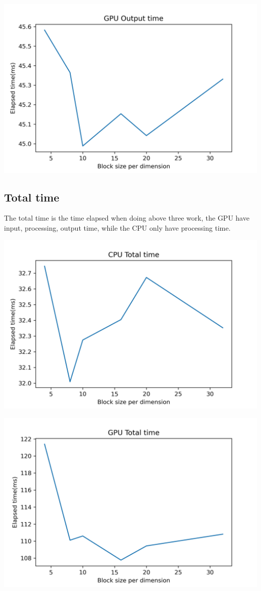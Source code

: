 \documentclass{article}
\begin{document}
	\includegraphics[width=\linewidth]{notebook/gpu_output_time}
	\subsection{Total time}
	The total time is the time elapsed when doing above three work, the GPU have input, processing, output time, while the CPU only have processing time.
	
	\includegraphics[width=\linewidth]{notebook/cpu_total_time}
	
	\includegraphics[width=\linewidth]{notebook/gpu_total_time}
	
\end{document}
